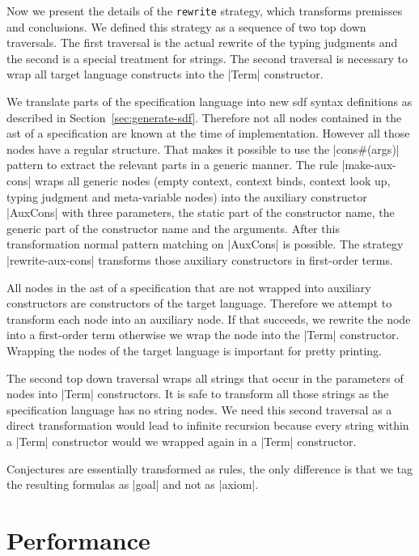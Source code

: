 Now we present the details of the \texttt{rewrite} strategy, which
transforms premisses and conclusions. We defined this strategy as a
sequence of two top down traversals. The first traversal is the actual
rewrite of the typing judgments and the second is a special treatment
for strings. The second traversal is necessary to wrap all target
language constructs into the \code|Term| constructor.

We translate parts of the specification language into new \gls{sdf}
syntax definitions as described in
Section~\ref{sec:generate-sdf}. Therefore not all nodes contained in
the \gls{ast} of a specification are known at the time of
implementation. However all those nodes have a regular structure. That
makes it possible to use the \code|cons#(args)| pattern to extract the
relevant parts in a generic manner. The rule \code|make-aux-cons|
wraps all generic nodes (empty context, context binds, context look
up, typing judgment and meta-variable nodes) into the auxiliary
constructor \code|AuxCons| with three parameters, the static part of
the constructor name, the generic part of the constructor name and the
arguments. After this transformation normal pattern matching on
\code|AuxCons| is possible. The strategy \code|rewrite-aux-cons|
transforms those auxiliary constructors in first-order terms.

All nodes in the \gls{ast} of a specification that are not wrapped
into auxiliary constructors are constructors of the target
language. Therefore we attempt to transform each node into an
auxiliary node. If that succeeds, we rewrite the node into a
first-order term otherwise we wrap the node into the \code|Term|
constructor. Wrapping the nodes of the target language is important
for pretty printing.

The second top down traversal wraps all strings that occur in the
parameters of nodes into \code|Term| constructors. It is safe to
transform all those strings as the specification language has no
string nodes. We need this second traversal as a direct transformation
would lead to infinite recursion because every string within a
\code|Term| constructor would we wrapped again in a \code|Term|
constructor.

Conjectures are essentially transformed as rules, the only difference
is that we tag the resulting formulas as \code|goal| and not as
\code|axiom|.
\section{Performance}
